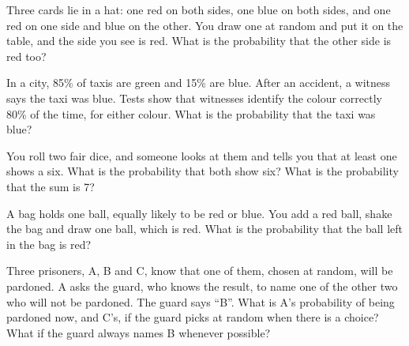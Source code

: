 \begin{question}\label{iq:iv1:conditional-probability-and-bayes:5}
Three cards lie in a hat: one red on both sides, one blue on both sides, and one red on one side and blue on the other. You draw one at random and put it on the table, and the side you see is red. What is the probability that the other side is red too?
\end{question}

\begin{question}\label{iq:iv1:conditional-probability-and-bayes:6}
In a city, 85\% of taxis are green and 15\% are blue. After an accident, a witness says the taxi was blue. Tests show that witnesses identify the colour correctly 80\% of the time, for either colour. What is the probability that the taxi was blue?
\end{question}

\begin{question}\label{iq:iv1:conditional-probability-and-bayes:7}
You roll two fair dice, and someone looks at them and tells you that at least one shows a six. What is the probability that both show six? What is the probability that the sum is 7?
\end{question}

\begin{question}\label{iq:iv1:conditional-probability-and-bayes:8}
A bag holds one ball, equally likely to be red or blue. You add a red ball, shake the bag and draw one ball, which is red. What is the probability that the ball left in the bag is red?
\end{question}

\begin{question}\label{iq:iv1:conditional-probability-and-bayes:9}
Three prisoners, A, B and C, know that one of them, chosen at random, will be pardoned. A asks the guard, who knows the result, to name one of the other two who will not be pardoned. The guard says ``B''. What is A's probability of being pardoned now, and C's, if the guard picks at random when there is a choice? What if the guard always names B whenever possible?
\end{question}

